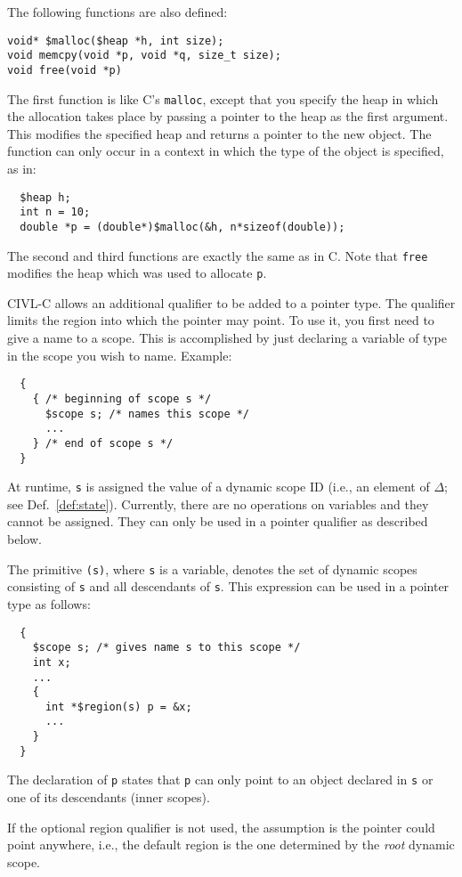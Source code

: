 \documentclass[11pt]{article}
\begin{document}
The following functions are also defined:
\begin{verbatim}
void* $malloc($heap *h, int size);
void memcpy(void *p, void *q, size_t size);
void free(void *p)
\end{verbatim}
The first function is like C's \texttt{malloc}, except that you
specify the heap in which the allocation takes place by passing a
pointer to the heap as the first argument.  This modifies the
specified heap and returns a pointer to the new object.  The function
can only occur in a context in which the type of the object is
specified, as in:
\begin{verbatim}
  $heap h;
  int n = 10;
  double *p = (double*)$malloc(&h, n*sizeof(double));
\end{verbatim}
The second and third functions are exactly the same as in C. Note that
\texttt{free} modifies the heap which was used to allocate \texttt{p}.

CIVL-C allows an additional qualifier to be added to a pointer
type.  The qualifier limits the region into which the pointer
may point.  To use it, you first need to give a name to a scope.
This is accomplished by just declaring a variable of type
\cscope{} in the scope you wish to name.  Example:
\begin{verbatim}
  {
    { /* beginning of scope s */
      $scope s; /* names this scope */
      ...
    } /* end of scope s */
  }
\end{verbatim}
At runtime, \texttt{s} is assigned the value of a dynamic scope ID
(i.e., an element of $\Delta$; see Def.\ \ref{def:state}).  Currently,
there are no operations on \cscope{} variables and they cannot be
assigned.  They can only be used in a pointer qualifier as described
below.

The primitive \texttt{\cregion(s)}, where \texttt{s} is a \cscope{}
variable, denotes the set of dynamic scopes consisting of \texttt{s}
and all descendants of \texttt{s}.  This expression can be used in a
pointer type as follows:
\begin{verbatim}
  {
    $scope s; /* gives name s to this scope */
    int x;
    ...
    {
      int *$region(s) p = &x;
      ...
    }
  }
\end{verbatim}
The declaration of \texttt{p} states that \texttt{p} can only point to
an object declared in \texttt{s} or one of its descendants (inner
scopes).

If the optional region qualifier is not used, the assumption is the
pointer could point anywhere, i.e., the default region is the one
determined by the \emph{root} dynamic scope.
\end{document}
